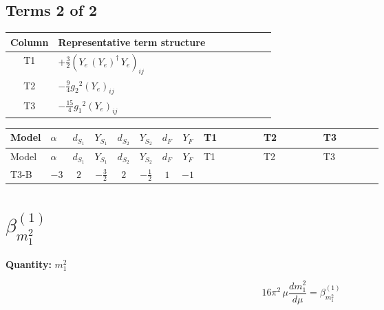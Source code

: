\documentclass[8pt]{article}
\begin{document}
\begin{landscape}
\subsection*{Terms 2 of 2}
\begin{center}
\begin{tabular}{@{}c >{\raggedright\arraybackslash}p{0.82\linewidth}@{}}
\toprule
Column & Representative term structure \\
\midrule
T1 & \(\displaystyle +\frac{3}{2} \left({Y_e}\,\left({Y_e}\right)^{\dagger}\,{Y_e}\right)_{ij}\) \\
\midrule
T2 & \(\displaystyle -\frac{9}{4} {g_2}^2 \left({Y_e}\right)_{ij}\) \\
\midrule
T3 & \(\displaystyle -\frac{15}{4} {g_1}^2 \left({Y_e}\right)_{ij}\) \\
\midrule
\bottomrule
\end{tabular}
\end{center}
\smallskip
\tiny
\begin{longtable}{@{}llcccccc >{\raggedright\arraybackslash}p{0.21\linewidth} >{\raggedright\arraybackslash}p{0.21\linewidth} >{\raggedright\arraybackslash}p{0.21\linewidth}@{}}
\toprule
Model & $\alpha$ & $d_{S_1}$ & $Y_{S_1}$ & $d_{S_2}$ & $Y_{S_2}$ & $d_F$ & $Y_F$ & T1 & T2 & T3 \\
\midrule
\endfirsthead
\toprule
Model & $\alpha$ & $d_{S_1}$ & $Y_{S_1}$ & $d_{S_2}$ & $Y_{S_2}$ & $d_F$ & $Y_F$ & T1 & T2 & T3 \\
\midrule
\endhead
T3-B & $-3$ & $2$ & $-\frac{3}{2}$ & $2$ & $-\frac{1}{2}$ & $1$ & $-1$ & \scriptsize\adjustbox{max width=\linewidth}{$\begin{gathered} +\frac{3}{2} \left({Y_e}\,\left({Y_e}\right)^{\dagger}\,{Y_e}\right)_{ij}\end{gathered}$} & \scriptsize\adjustbox{max width=\linewidth}{$\begin{gathered} -\frac{9}{4} {g_2}^2 \left({Y_e}\right)_{ij}\end{gathered}$} & \scriptsize\adjustbox{max width=\linewidth}{$\begin{gathered} -\frac{15}{4} {g_1}^2 \left({Y_e}\right)_{ij}\end{gathered}$} \\
\midrule
\bottomrule
\end{longtable}
\clearpage
\section*{$\beta_{m_1^2}^{(1)}$}
\noindent\textbf{Quantity: }$m_1^2$\par\smallskip
\[16\pi^2\,\mu\frac{d m_1^2}{d\mu}=\beta_{m_1^2}^{(1)}\]

\end{landscape}
\end{document}
